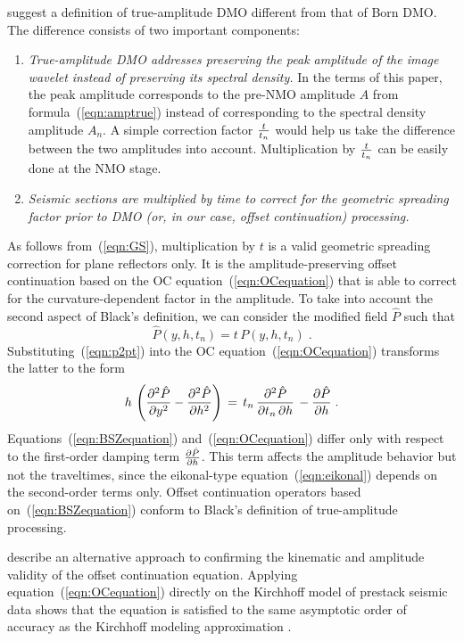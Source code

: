 \cite{GEO58-01-00470066} suggest a definition of true-amplitude DMO different
from that of Born DMO. The difference consists of two important
components:
\begin{enumerate}
\item {\em True-amplitude DMO addresses preserving the peak amplitude
    of the image wavelet instead of preserving its spectral density.}
  In the terms of this paper, the peak amplitude corresponds to the
  pre-NMO amplitude $A$ from formula~(\ref{eqn:amptrue}) instead of
  corresponding to the spectral density amplitude $A_n$.  A simple
  correction factor $t \over t_n$ would help us take the difference
  between the two amplitudes into account. Multiplication by $t \over
  t_n$ can be easily done at the NMO stage.
\item {\em Seismic sections are multiplied by time to correct for the
    geometric spreading factor prior to DMO (or, in our case, offset
    continuation) processing.} \end{enumerate} As follows
from~(\ref{eqn:GS}), multiplication by $t$ is a valid geometric
spreading correction for plane reflectors only.  It is the
amplitude-preserving offset continuation based on the OC
equation~(\ref{eqn:OCequation}) that is able to correct for the
curvature-dependent factor in the amplitude. To take into account the
second aspect of Black's definition, we can consider the modified
field $\hat{P}$ such that
\begin{equation}
\hat{P}\left(y,h,t_n\right)=t\,P\left(y,h,t_n\right)\;.
\label{eqn:p2pt}
\end{equation}
Substituting~(\ref{eqn:p2pt}) into the OC equation~(\ref{eqn:OCequation}) transforms the
latter to the form
\begin{equation}
h \, \left( {\partial^2 \hat{P} \over \partial y^2} - {\partial^2 \hat{P} \over
\partial h^2} \right) \, = \, t_n \, {\partial^2 \hat{P} \over {\partial t_n \,
\partial h}}\, -{\partial \hat{P} \over \partial h}\; . 
\label{eqn:BSZequation} 
\end{equation}
Equations~(\ref{eqn:BSZequation}) and~(\ref{eqn:OCequation}) differ
only with respect to the first-order damping term $\partial \hat{P}
\over \partial h$.  This term affects the amplitude behavior but not
the traveltimes, since the eikonal-type equation~(\ref{eqn:eikonal})
depends on the second-order terms only.  Offset continuation operators
based on~(\ref{eqn:BSZequation}) conform to Black's definition of
true-amplitude processing.

\cite{menorm} describe an alternative approach to
confirming the kinematic and amplitude validity of the offset
continuation equation. Applying equation~(\ref{eqn:OCequation})
directly on the Kirchhoff model of prestack seismic data shows that
the equation is satisfied to the same asymptotic order of accuracy
as the Kirchhoff modeling approximation \cite[]{haddon,norm}.

